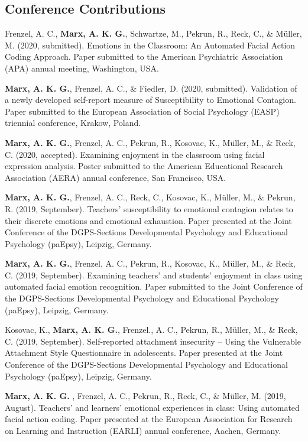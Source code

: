 \documentclass[letterpaper]{article}
\renewenvironment{itemize}{ %
  \begin{list}{}{ %
    \setlength{\leftmargin}{2.5em} %
  }
}{
  \end{list}
}
\begin{document}
\subsection*{Conference Contributions}
\begin{itemize}
\item Frenzel, A. C., {\bf Marx, A. K. G.}, Schwartze, M., Pekrun, R., Reck, C., \& Müller, M. (2020, submitted). Emotions in the Classroom: An Automated Facial Action Coding Approach. Paper submitted to the American Psychiatric Association (APA) annual meeting, Washington, USA.
\item {\bf Marx, A. K. G.}, Frenzel, A. C., \& Fiedler, D. (2020, submitted). Validation of a newly developed self-report measure of Susceptibility to Emotional Contagion. Paper submitted to the European Association of Social Psychology (EASP) triennial conference, Krakow, Poland.
\item {\bf Marx, A. K. G.}, Frenzel, A. C., Pekrun, R., Kosovac, K., Müller, M., \& Reck, C. (2020, accepted). Examining enjoyment in the classroom using facial expression analysis. Poster submitted to the American Educational Research Association (AERA) annual conference, San Francisco, USA.
\item {\bf Marx, A. K. G.}, Frenzel, A. C., Reck, C., Kosovac, K., Müller, M., \& Pekrun, R. (2019, September). Teachers’ susceptibility to emotional contagion relates to their discrete emotions and emotional exhaustion. Paper presented at the Joint Conference of the DGPS-Sections Developmental Psychology and Educational Psychology (paEpsy), Leipzig, Germany.
\item {\bf Marx, A. K. G.}, Frenzel, A. C., Pekrun, R., Kosovac, K., Müller, M., \& Reck, C. (2019, September). Examining teachers’ and students’ enjoyment in class using automated facial emotion recognition. Paper submitted to the Joint Conference of the DGPS-Sections Developmental Psychology and Educational Psychology (paEpsy), Leipzig, Germany.
\item Kosovac, K., {\bf Marx, A. K. G.}, Frenzel., A. C., Pekrun, R., Müller, M., \& Reck, C. (2019, September). Self-reported attachment insecurity – Using the Vulnerable Attachment Style Questionnaire in adolescents. Paper presented at the Joint Conference of the DGPS-Sections Developmental Psychology and Educational Psychology (paEpsy), Leipzig, Germany.
\item {\bf Marx, A. K. G. }, Frenzel, A. C., Pekrun, R., Reck, C., \& Müller, M. (2019, August). Teachers’ and learners’ emotional experiences in class: Using automated facial action coding. Paper presented at the European Association for Research on Learning and Instruction (EARLI) annual conference, Aachen, Germany.

\end{itemize}
\end{document}
